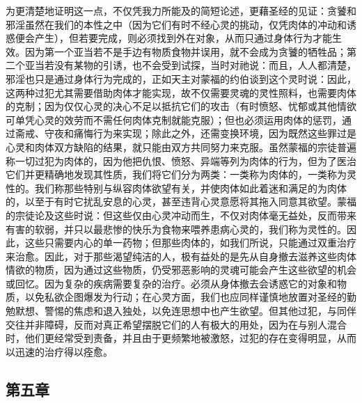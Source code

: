 为更清楚地证明这一点，不仅凭我力所能及的简短论述，更藉圣经的见证：贪饕和邪淫虽然在我们的本性之中（因为它们有时不经心灵的挑动，仅凭肉体的冲动和诱惑便会产生），但若要完成，则必须找到外在对象，从而只通过身体行为才能生效。因为第一个亚当若不是手边有物质食物并误用，就不会成为贪饕的牺牲品；第二个亚当若没有某物的引诱，也不会受到试探，当时对祂说：而且，人人都清楚，邪淫也只是通过身体行为完成的，正如天主对蒙福的约伯谈到这个灵时说：因此，这两种过犯尤其需要借助肉体才能实现，故不仅需要灵魂的灵性照料，也需要肉体的克制；因为仅仅心灵的决心不足以抵抗它们的攻击（有时愤怒、忧郁或其他情欲可单凭心灵的效劳而不需任何肉体克制就能克服）；但也必须运用肉体的惩罚，通过斋戒、守夜和痛悔行为来实现；除此之外，还需变换环境，因为既然这些罪过是心灵和肉体双方缺陷的结果，就只能由双方共同努力来克服。虽然蒙福的宗徒普遍称一切过犯为肉体的，因为他把仇恨、愤怒、异端等列为肉体的行为，但为了医治它们并更精确地发现其性质，我们将它们分为两类：一类称为肉体的，一类称为灵性的。我们称那些特别与纵容肉体欲望有关，并使肉体如此着迷和满足的为肉体的，以至于有时它扰乱安息的心灵，甚至违背心灵意愿将其拖入同意其欲望。蒙福的宗徒论及这些时说：但这些仅由心灵冲动而生，不仅对肉体毫无益处，反而带来有害的软弱，并只以最悲惨的快乐为食物来喂养患病心灵的，我们称为灵性的。因此，这些只需要内心的单一药物；但那些肉体的，如我们所说，只能通过双重治疗来治愈。因此，对于那些渴望纯洁的人，极有益处的是先从自身撤去滋养这些肉体情欲的物质，因为通过这些物质，仍受邪恶影响的灵魂可能会产生这些欲望的机会或回忆。因为复杂的疾病需要复杂的治疗。必须从身体撤去会诱惑它的对象和物质，以免私欲企图爆发为行动；在心灵方面，我们也应同样谨慎地放置对圣经的勤勉默想、警惕的焦虑和退入独处，以免连思想中也产生欲望。但其他过犯，与同伴交往并非障碍，反而对真正希望摆脱它们的人有极大的用处，因为在与别人混合时，他们更经常受到责备，并且由于更频繁地被激怒，过犯的存在变得明显，从而以迅速的治疗得以痊愈。\par


\subsection{第五章}

